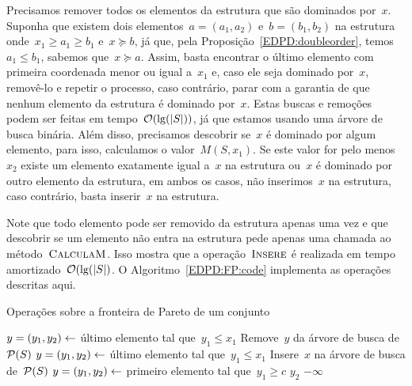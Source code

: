 Precisamos remover todos os elementos da estrutura que são dominados por~$x$. Suponha que existem dois elementos~$a = (a_1,a_2)$ e~$b = (b_1,b_2)$ na estrutura onde~$x_1 \geq a_1 \geq b_1$ e~$x \succeq b$, já que, pela Proposição~\ref{EDPD:doubleorder}, temos~$a_1 \leq b_1$, sabemos que~$x \succeq a$. Assim, basta encontrar o último elemento com primeira coordenada menor ou igual a~$x_1$ e, caso ele seja dominado por~$x$, removê-lo e repetir o processo, caso contrário, parar com a garantia de que nenhum elemento da estrutura é dominado por~$x$. Estas buscas e remoções podem ser feitas em tempo~$\mathcal{O}(\lg(|S|))$, já que estamos usando uma árvore de busca binária. Além disso, precisamos descobrir se~$x$ é dominado por algum elemento, para isso, calculamos o valor~$M(S,x_1)$. Se este valor for pelo menos~$x_2$ existe um elemento exatamente igual a~$x$ na estrutura ou~$x$ é dominado por outro elemento da estrutura, em ambos os casos, não inserimos~$x$ na estrutura, caso contrário, basta inserir~$x$ na estrutura.

Note que todo elemento pode ser removido da estrutura apenas uma vez e que descobrir se um elemento não entra na estrutura pede apenas uma chamada ao método~$\textsc{CalculaM}$. Isso mostra que a operação~$\textsc{Insere}$ é realizada em tempo amortizado~$\mathcal{O}(\lg(|S|)$. O Algoritmo~\ref{EDPD:FP:code} implementa as operações descritas aqui.

\begin{algorithm}[h]
\caption{Operações sobre a fronteira de Pareto de um conjunto}
\label{EDPD:FP:code}
\begin{algorithmic}[1]
    \State $y = (y_1,y_2) \leftarrow$ último elemento tal que~$y_1 \leq x_1$
        \State Remove~$y$ da árvore de busca de~$\mathcal{P}(S)$
        \State $y = (y_1,y_2) \leftarrow$ último elemento tal que~$y_1 \leq x_1$
    \EndWhile
        \State Insere~$x$ na árvore de busca de~$\mathcal{P}(S)$
    \EndIf
\EndFunction
{}
    \State $y = (y_1,y_2) \leftarrow$ primeiro elemento tal que~$y_1 \geq c$
        \State \Return $y_2$
    \Else
        \State \Return $-\infty$
    \EndIf
\EndFunction
\end{algorithmic}
\end{algorithm}



